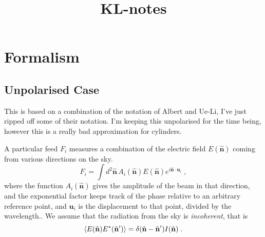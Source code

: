 \documentclass{revtex4}
\newcommand{\la}{\ensuremath{\left\langle}}
\newcommand{\ra}{\ensuremath{\right\rangle}}
\begin{document}
\title{KL-notes}

\renewcommand{\vec}[1]{\mathbf{#1}}
\newcommand{\mat}[1]{\mathbf{#1}}

\newcommand{\hconj}{\ensuremath{\dagger}}

\newcommand{\vx}{\vec{x}}
\newcommand{\vs}{\vec{s}}
\newcommand{\vn}{\vec{n}}
\newcommand{\va}{\vec{a}}
\newcommand{\vv}{\vec{v}}

\newcommand{\mS}{\mat{S}}
\newcommand{\mN}{\mat{N}}
\newcommand{\mR}{\mat{R}}
\newcommand{\mC}{\mat{C}}
\newcommand{\mB}{\mat{B}}

\newcommand{\tcm}{\ensuremath{21\,\mathrm{cm}}}

\newcommand{\vnhat}{\hat{\vec{n}}}
\newcommand{\vu}{\vec{u}}

\newcommand{\brsc}[1]{{\ensuremath{\scriptscriptstyle \left(#1\right)}}}

\maketitle


\section{Formalism}

\subsection{Unpolarised Case}

This is based on a combination of the notation of Albert and Ue-Li,
I've just ripped off some of their notation. I'm keeping this
unpolarised for the time being, however this is a really bad
approximation for cylinders.

A particular feed $F_i$ measures a combination of the electric field
$E(\vnhat)$ coming from various directions on the sky.
\begin{equation}
F_i = \int d^2\vnhat \, A_i(\vnhat) E(\vnhat) e^{i \vnhat\cdot\vu_i}\; ,
\end{equation}
where the function $A_i(\vnhat)$ gives the amplitude of the beam in
that direction, and the exponential factor keeps track of the phase
relative to an arbitrary reference point, and $\vu_i$ is the
displacement to that point, divided by the wavelength.. We assume that the
radiation from the sky is \emph{incoherent}, that is
\begin{equation}
\la E(\vnhat) E^* (\vnhat') \ra = \delta(\vnhat - \vnhat') I(\vnhat) \; .
\end{equation}
\end{document}
